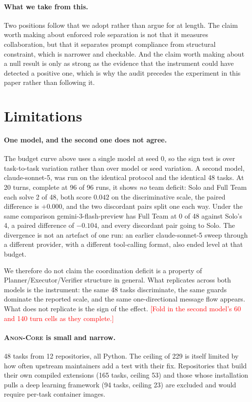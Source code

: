 \documentclass[11pt]{article}
\newcommand{\core}{\textsc{Anon-Core}}
\newcommand{\core}{\textsc{TeamBench-Core}}
\newcommand{\todo}[1]{\textcolor{red}{[#1]}}
\begin{document}
\paragraph{What we take from this.} Two positions follow that we adopt rather
than argue for at length. The claim worth making about enforced role separation
is not that it measures collaboration, but that it separates prompt compliance
from structural constraint, which is narrower and checkable. And the claim worth
making about a null result is only as strong as the evidence that the instrument
could have detected a positive one, which is why the audit precedes the
experiment in this paper rather than following it.

\section{Limitations}

\paragraph{One model, and the second one does not agree.} The budget curve above
uses a single model at seed 0, so the sign test is over task-to-task variation
rather than over model or seed variation. A second model, claude-sonnet-5, was
run on the identical protocol and the identical 48 tasks. At 20 turns, complete
at 96 of 96 runs, it shows \emph{no} team deficit: Solo and Full Team each solve
2 of 48, both score $0.042$ on the discriminative scale, the paired difference is
$+0.000$, and the two discordant pairs split one each way. Under the same
comparison gemini-3-flash-preview has Full Team at 0 of 48 against Solo's 4, a
paired difference of $-0.104$, and every discordant pair going to Solo. The
divergence is not an artefact of one run: an earlier claude-sonnet-5 sweep
through a different provider, with a different tool-calling format, also ended
level at that budget.

We therefore do not claim the coordination deficit is a property of
Planner/Executor/Verifier structure in general. What replicates across both
models is the instrument: the same 48 tasks discriminate, the same guards
dominate the reported scale, and the same one-directional message flow appears.
What does not replicate is the sign of the effect.
\todo{Fold in the second model's 60 and 140 turn cells as they complete.}

\paragraph{\core{} is small and narrow.} 48 tasks from 12 repositories, all
Python. The ceiling of 229 is itself limited by how often upstream maintainers
add a test with their fix. Repositories that build their own compiled
extensions (165 tasks, ceiling 53) and those whose installation pulls a deep
learning framework (94 tasks, ceiling 23) are excluded and would require
per-task container images.
\end{document}
